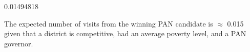 \documentclass[12pt,letterpaper]{article}
\begin{document}
\begin{enumerate}
	  
	
	\begin{verbnobox}[\footnotesize]
		0.01494818
	\end{verbnobox}		
	
	The expected number of visits from the winning PAN candidate is $\approx$ 0.015 given that a district is competitive, had an average poverty level, and a PAN governor.\\
\end{enumerate}
\end{document}

